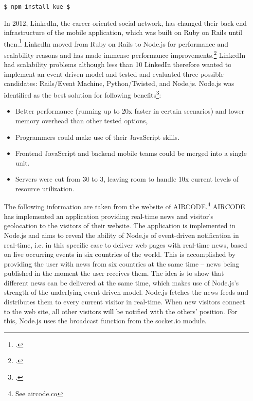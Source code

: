 \begin{appendices}
\begin{subappendices}
\begin{lstlisting}[language=javascript,caption={Installing Kue via command-line},label=lst:installkue]
$ npm install kue $
\end{lstlisting}

In 2012, LinkedIn, the career-oriented social network, has changed their back-end infrastructure of the mobile application, which was built on Ruby on Rails until then.\footcite[Cf.][]{Avram_2012} LinkedIn moved from Ruby on Rails to Node.js for performance and scalability reasons and has made immense performance improvements.\footcite[Cf.][]{ODell_2011} 
LinkedIn had scalability problems although less than 10%
LinkedIn therefore wanted to implement an event-driven model and tested and evaluated three possible candidates: Rails/Event Machine, Python/Twisted, and Node.js.
Node.js was identified as the best solution for following benefits\footcite[Cf.][]{Avram_2012}:
\begin{itemize}
  \item Better performance (running up to 20x faster in certain scenarios) and lower memory overhead than other tested options, 
  \item Programmers could make use of their JavaScript skills. 
  \item Frontend JavaScript and backend mobile teams could be merged into a single unit. 
  \item Servers were cut from 30 to 3, leaving room to handle 10x current levels of resource utilization.
\end{itemize}


The following information are taken from the website of AIRCODE.\footnote{See aircode.co}
AIRCODE has implemented an application providing real-time news and visitor’s geolocation to the visitors of their website. The application is implemented in Node.js and aims to reveal the ability of Node.js of event-driven notification in real-time, i.e. in this specific case to deliver web pages with real-time news, based on live occurring events in six countries of the world. This is accomplished by providing the user with news from six countries at the same time – news being published in the moment the user receives them. The idea is to show that different news can be delivered at the same time, which makes use of Node.js’s strength of the underlying event-driven model.
Node.js fetches the news feeds and distributes them to every current visitor in real-time. When new visitors connect to the web site, all other visitors will be notified with the others’ position. For this, Node.js uses the broadcast function from the socket.io module.


\end{subappendices}
\end{appendices}

